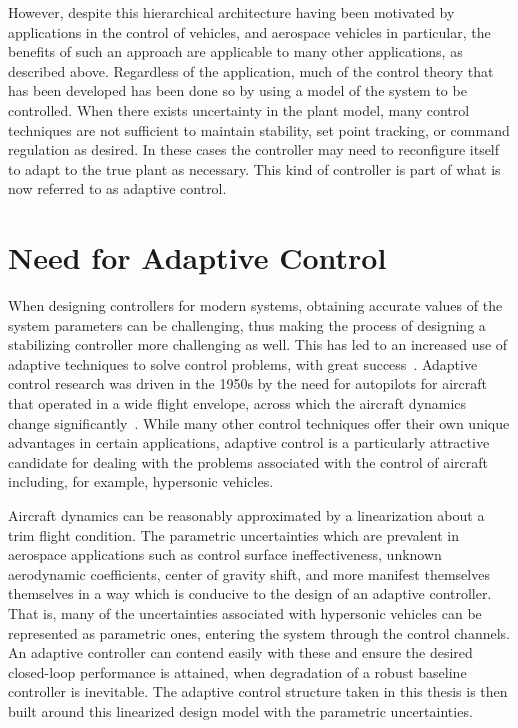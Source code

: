 However, despite this hierarchical architecture having been motivated by applications in the control of vehicles, and aerospace vehicles in particular, the benefits of such an approach are applicable to many other applications, as described above.
Regardless of the application, much of the control theory that has been developed has been done so by using a model of the system to be controlled.
When there exists uncertainty in the plant model, many control techniques are not sufficient to maintain stability, set point tracking, or command regulation as desired.
In these cases the controller may need to reconfigure itself to adapt to the true plant as necessary.
This kind of controller is part of what is now referred to as adaptive control.

\section{Need for Adaptive Control}

When designing controllers for modern systems, obtaining accurate values of the system parameters can be challenging, thus making the process of designing a stabilizing controller more challenging as well.
This has led to an increased use of adaptive techniques to solve control problems, with great success\ \cite{lavretskywise.book.2013}.
Adaptive control research was driven in the 1950s by the need for autopilots for aircraft that operated in a wide flight envelope, across which the aircraft dynamics change significantly\ \cite{astrom.feedback.1987}.
While many other control techniques offer their own unique advantages in certain applications, adaptive control is a particularly attractive candidate for dealing with the problems associated with the control of aircraft including, for example, hypersonic vehicles.

Aircraft dynamics can be reasonably approximated by a linearization about a trim flight condition.
The parametric uncertainties which are prevalent in aerospace applications such as control surface ineffectiveness, unknown aerodynamic coefficients, center of gravity shift, and more manifest themselves themselves in a way which is conducive to the design of an adaptive controller.
That is, many of the uncertainties associated with hypersonic vehicles can be represented as parametric ones, entering the system through the control channels.
An adaptive controller can contend easily with these and ensure the desired closed-loop performance is attained, when degradation of a robust baseline controller is inevitable.
The adaptive control structure taken in this thesis is then built around this linearized design model with the parametric uncertainties.

